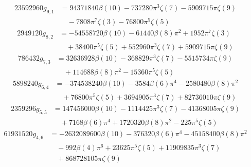 \begin{equation}\begin{split}23592960 g_{9,1} &= 94371840 \beta(10) - 737280 \pi^{3} \zeta(7) - 5909715 \pi \zeta(9)\\ &\quad {}- 7808 \pi^{7} \zeta(3) - 76800 \pi^{5} \zeta(5)\end{split}\end{equation}
\begin{equation}\begin{split}2949120 g_{8,2} &= - 54558720 \beta(10) - 61440 \beta(8) \pi^{2} + 1952 \pi^{7} \zeta(3)\\ &\quad {}+38400 \pi^{5} \zeta(5) + 552960 \pi^{3} \zeta(7) + 5909715 \pi \zeta(9)\end{split}\end{equation}
\begin{equation}\begin{split}786432 g_{7,3} &= 32636928 \beta(10) - 368829 \pi^{3} \zeta(7) - 5515734 \pi \zeta(9)\\ &\quad {}+114688 \beta(8) \pi^{2} - 15360 \pi^{5} \zeta(5)\end{split}\end{equation}
\begin{equation}\begin{split}5898240 g_{6,4} &= - 374538240 \beta(10) - 3584 \beta(6) \pi^{4} - 2580480 \beta(8) \pi^{2}\\ &\quad {}+76800 \pi^{5} \zeta(5) + 3694905 \pi^{3} \zeta(7) + 82736010 \pi \zeta(9)\end{split}\end{equation}
\begin{equation}\begin{split}2359296 g_{5,5} &= 147456000 \beta(10) - 1114425 \pi^{3} \zeta(7) - 41368005 \pi \zeta(9)\\ &\quad {}+7168 \beta(6) \pi^{4} + 1720320 \beta(8) \pi^{2} - 225 \pi^{5} \zeta(5)\end{split}\end{equation}
\begin{equation}\begin{split}61931520 g_{4,6} &= - 2632089600 \beta(10) - 376320 \beta(6) \pi^{4} - 45158400 \beta(8) \pi^{2}\\ &\quad {}- 992 \beta(4) \pi^{6} + 23625 \pi^{5} \zeta(5) + 11909835 \pi^{3} \zeta(7)\\ &\quad {}+868728105 \pi \zeta(9)\end{split}\end{equation}
